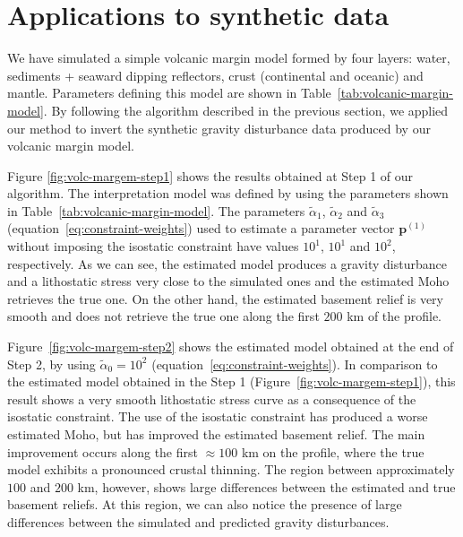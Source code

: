 \documentclass[manuscript]{geophysics}
\begin{document}
\section{Applications to synthetic data}


We have simulated a simple volcanic margin model formed by four layers: 
water, sediments + seaward dipping reflectors, crust (continental and oceanic) 
and mantle. 
Parameters defining this model are shown in Table~\ref{tab:volcanic-margin-model}.
By following the algorithm described in the previous section, we applied our method 
to invert the synthetic gravity disturbance data produced by our volcanic margin model.

Figure \ref{fig:volc-margem-step1} shows the results obtained at Step 1 of our
algorithm.
The interpretation model was defined by using the parameters shown in
Table~\ref{tab:volcanic-margin-model}.
The parameters $\tilde{\alpha}_{1}$, $\tilde{\alpha}_{2}$ and 
$\tilde{\alpha}_{3}$ (equation~\ref{eq:constraint-weights}) used to estimate a parameter 
vector $\mathbf{p}^{(1)}$ without imposing the isostatic constraint have values $10^{1}$, $10^{1}$ and $10^{2}$, respectively.
As we can see, the estimated model produces a gravity disturbance and a 
lithostatic stress very close to the simulated ones and the
estimated Moho retrieves the true one.
On the other hand, the estimated basement relief is very smooth and does not
retrieve the true one along the first $200$ km of the profile.

Figure~\ref{fig:volc-margem-step2} shows the estimated model obtained at the end
of Step 2, by using $\tilde{\alpha}_{0} = 10^{2}$ (equation~\ref{eq:constraint-weights}).
In comparison to the estimated model obtained in the Step 1 (Figure~\ref{fig:volc-margem-step1}),
this result shows a very smooth lithostatic stress curve as a consequence of the
isostatic constraint. The use of the isostatic constraint has produced a worse estimated Moho, 
but has improved the estimated basement relief. The main improvement occurs along the 
first $\approx 100$ km on the profile, where the true model exhibits a pronounced crustal
thinning. The region between approximately $100$ and $200$ km, however, shows large 
differences between the estimated and true basement reliefs. At this region, we can also
notice the presence of large differences between the simulated and predicted gravity
disturbances.
\end{document}
